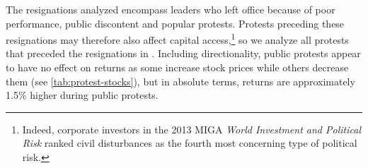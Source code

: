 \documentclass[12pt,final,fleqn]{article}
\theoremstyle{plain}
\begin{document}




The resignations analyzed encompass leaders who left office because of poor performance, public discontent and popular protests. Protests preceding these resignations may therefore also affect capital access,\footnote{Indeed, corporate investors in the 2013 MIGA \textit{World Investment and Political Risk} ranked civil disturbances as the fourth most concerning type of political risk.} so we analyze all protests that preceded the resignations in . Including directionality, public protests appear to have no effect on returns as some increase stock prices while others decrease them (see \autoref{tab:protest-stocks}), but in absolute terms, returns are approximately 1.5\% higher during public protests.
\end{document}
